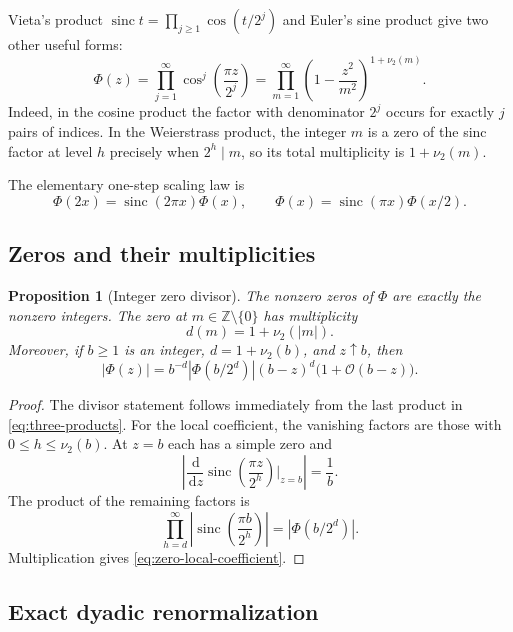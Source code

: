 \documentclass[11pt,oneside]{article}
\newtheorem{proposition}[proposition]{Proposition}
\theoremstyle{definition}
\theoremstyle{remark}
\newcommand{\Z}{\mathbb Z}
\newcommand{\dd}{\,\mathrm d}
\newcommand{\sinc}{\operatorname{sinc}}
\newcommand{\Phiup}{\Phi}
\newcommand{\bigO}{\mathcal O}
\newcommand{\vtwo}{\nu_2}
\newcommand{\abs}[1]{\left|#1\right|}
\begin{document}
Vieta's product $\sinc t=\prod_{j\ge1}\cos(t/2^j)$ and Euler's sine product give two other
useful forms:
\begin{equation}
 \Phiup(z)
 =\prod_{j=1}^{\infty}\cos^j\!\left(\frac{\pi z}{2^j}\right)
 =\prod_{m=1}^{\infty}
   \left(1-\frac{z^2}{m^2}\right)^{1+\vtwo(m)}.
 \label{eq:three-products}
\end{equation}
Indeed, in the cosine product the factor with denominator $2^j$ occurs for exactly $j$
pairs of indices.  In the Weierstrass product, the integer $m$ is a zero of the sinc factor
at level $h$ precisely when $2^h\mid m$, so its total multiplicity is $1+\vtwo(m)$.

The elementary one-step scaling law is
\begin{equation}
 \Phiup(2x)=\sinc(2\pi x)\Phiup(x),
 \qquad
 \Phiup(x)=\sinc(\pi x)\Phiup(x/2).
 \label{eq:one-step-scaling}
\end{equation}

\subsection{Zeros and their multiplicities}

\begin{proposition}[Integer zero divisor]
\label{prop:zero-divisor}
The nonzero zeros of $\Phiup$ are exactly the nonzero integers.  The zero at
$m\in\Z\setminus\{0\}$ has multiplicity
\[
 d(m)=1+\vtwo(\abs m).
\]
Moreover, if $b\ge1$ is an integer, $d=1+\vtwo(b)$, and $z\uparrow b$, then
\begin{equation}
 \abs{\Phiup(z)}
 =b^{-d}\abs{\Phiup(b/2^d)}(b-z)^d\bigl(1+\bigO(b-z)\bigr).
 \label{eq:zero-local-coefficient}
\end{equation}
\end{proposition}

\begin{proof}
The divisor statement follows immediately from the last product in
\eqref{eq:three-products}.  For the local coefficient, the vanishing factors are those with
$0\le h\le\vtwo(b)$.  At $z=b$ each has a simple zero and
\[
 \abs{\frac{\dd}{\dd z}\sinc\!\left(\frac{\pi z}{2^h}\right)\Big|_{z=b}}
 =\frac1b.
\]
The product of the remaining factors is
\[
 \prod_{h=d}^{\infty}
 \abs{\sinc\!\left(\frac{\pi b}{2^h}\right)}
 =\abs{\Phiup(b/2^d)}.
\]
Multiplication gives \eqref{eq:zero-local-coefficient}.
\end{proof}

\subsection{Exact dyadic renormalization}
\label{subsec:dyadic-renormalization}
\end{document}

